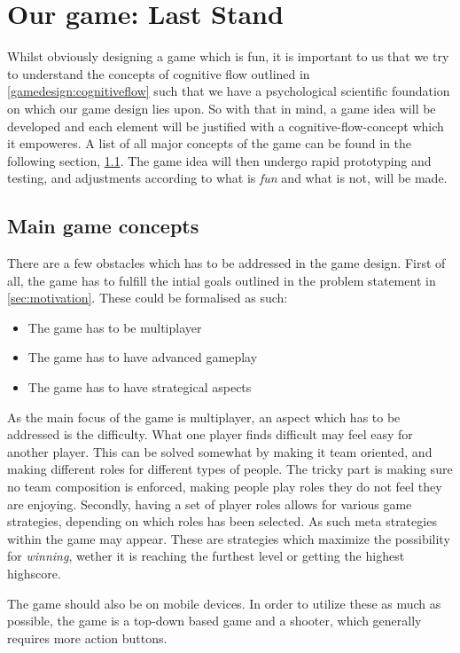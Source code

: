 \section{Our game: Last Stand}
Whilst obviously designing a game which is fun, it is important to us that we try to understand the concepts of cognitive flow outlined in \ref{gamedesign:cognitiveflow} such that we have a psychological scientific foundation on which our game design lies upon. 
So with that in mind, a game idea will be developed and each element will be justified with a cognitive-flow-concept which it empoweres. A list of all major concepts of the game can be found in the following section, \ref{gamedesign:maingameconcepts}. 
The game idea will then undergo rapid prototyping and testing, and adjustments according to what is \emph{fun} and what is not, will be made.  

\subsection{Main game concepts}\label{gamedesign:maingameconcepts}
There are a few obstacles which has to be addressed in the game design. First of all, the game has to fulfill the intial goals outlined in the problem statement in \ref{sec:motivation}. These could be formalised as such:
\begin{itemize}
\item The game has to be multiplayer
\item The game has to have advanced gameplay
\item The game has to have strategical aspects
\end{itemize}

As the main focus of the game is multiplayer, an aspect which has to be addressed is the difficulty. What one player finds difficult may feel easy for another player. This can be solved somewhat by making it team oriented, and making different roles for different types of people. The tricky part is making sure no team composition is enforced, making people play roles they do not feel they are enjoying. 
Secondly, having a set of player roles allows for various game strategies, depending on which roles has been selected. As such meta strategies within the game may appear. These are strategies which maximize the possibility for \emph{winning}, wether it is reaching the furthest level or getting the highest highscore. 

The game should also be on mobile devices. In order to utilize these as much as possible, the game is a top-down based game and a shooter, which generally requires more action buttons.


